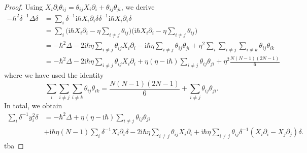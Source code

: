 \documentclass[11pt]{report}
\theoremstyle{definition}
\theoremstyle{remark}
\theoremstyle{remark}
\newcommand{\I}{\mathrm{i}}
\begin{document}
\begin{proof}
Using $X_i \partial_i \theta_{ij} = \theta_{ij}X_i \partial_i + \theta_{ij} \theta_{ji}$, we derive
\begin{align*}
-\hbar^2 \delta^{-1} \Delta \delta
&= \sum_i \delta^{-1} \I\hbar X_i \partial_i \delta \delta^{-1} \I\hbar X_i \partial_i \delta \\
&= \sum_i \bigg( \I \hbar X_i \partial_i - \eta \sum_{i \neq j} \theta_{ij} \bigg) \bigg( \I \hbar X_i \partial_i - \eta \sum_{i \neq j} \theta_{ij} \bigg) \\
&= -\hbar^2 \Delta - 2\I\hbar\eta \sum_{i \neq j} \theta_{ij} X_i \partial_i - \I\hbar\eta \sum_{i \neq j} \theta_{ij} \theta_{ji} + \eta^2 \sum_i \sum_{i \neq j} \sum_{i \neq k} \theta_{ij} \theta_{ik} \\
&= -\hbar^2 \Delta - 2\I\hbar\eta \sum_{i \neq j} \theta_{ij} X_i \partial_i + \eta(\eta-\I\hbar) \sum_{i \neq j} \theta_{ij} \theta_{ji} + \eta^2 \frac{N(N-1)(2N-1)}{6}
\end{align*}
where we have used the identity
\begin{equation*}
\sum_i \sum_{i \neq j} \sum_{i \neq k} \theta_{ij} \theta_{ik} = \frac{N(N-1)(2N-1)}{6} + \sum_{i \neq j} \theta_{ij} \theta_{ji}.
\end{equation*}
In total, we obtain
\begin{align*}
\sum_i \delta^{-1} y_i^2 \delta
&= -\hbar^2 \Delta + \eta(\eta-\I\hbar) \sum_{i \neq j} \theta_{ij} \theta_{ji} \\
&+ \I\hbar\eta (N-1) \sum_i \delta^{-1} X_i \partial_i \delta - 2\I\hbar\eta \sum_{i \neq j} \theta_{ij} X_i \partial_i + \I \hbar \eta \sum_{i \neq j} \theta_{ij} \delta^{-1} (X_i \partial_i-X_j \partial_j) \delta.
\end{align*}
tba
\end{proof}
\end{document}
